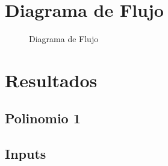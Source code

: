 \documentclass[6pt]{article}
\begin{document}
\newpage
\section{Diagrama de Flujo}
\begin{figure}[htpb]
	\centering
	
	\caption{Diagrama de Flujo}
\end{figure}
\newpage
\section{Resultados}
\subsection{Polinomio 1}
\subsection{Inputs}
\end{document}
